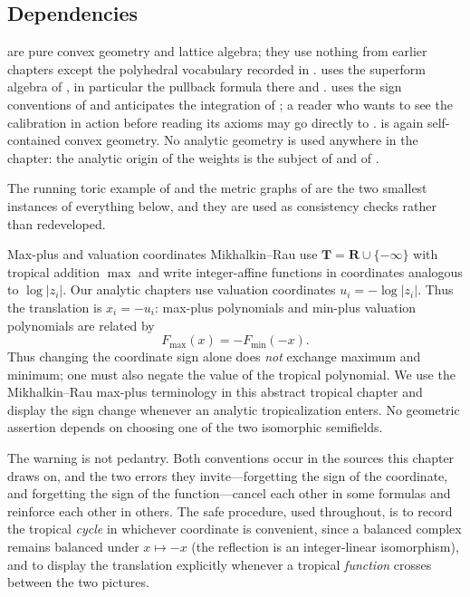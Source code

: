 \subsection*{Dependencies}

 are pure convex geometry and
lattice algebra; they use nothing from earlier chapters except the polyhedral
vocabulary recorded in .
 uses the superform algebra of
, in particular the pullback formula there and
.
 uses the sign conventions of
 and anticipates the integration of
; a reader who wants to see the calibration
in action before reading its axioms may go directly to
.
 is again self-contained convex geometry.
No analytic geometry is used anywhere in the chapter: the analytic origin of
the weights is the subject of  and of
.

The running toric example of  and the metric
graphs of  are the two smallest instances of
everything below, and they are used as consistency checks rather than
redeveloped.

\begin{warning}{Max-plus and valuation coordinates}
Mikhalkin--Rau use
$\mathbf T=\mathbf R\cup\{-\infty\}$ with tropical addition $\max$ and write
integer-affine functions in coordinates analogous to $\log|z_i|$.  Our
analytic chapters use valuation coordinates
$u_i=-\log|z_i|$.  Thus the translation is $x_i=-u_i$: max-plus polynomials
and min-plus valuation polynomials are related by
\[
                         F_{\max}(x)=-F_{\min}(-x).
\]
Thus changing the coordinate sign alone does \emph{not} exchange maximum
and minimum; one must also negate the value of the tropical polynomial.  We
use the Mikhalkin--Rau
max-plus terminology in this abstract tropical chapter and display the sign
change whenever an analytic tropicalization enters.  No geometric assertion
depends on choosing one of the two isomorphic semifields.
\end{warning}

The warning is not pedantry.  Both conventions occur in the sources this
chapter draws on, and the two errors they invite---forgetting the sign of the
coordinate, and forgetting the sign of the function---cancel each other in
some formulas and reinforce each other in others.  The safe procedure, used
throughout, is to record the tropical \emph{cycle} in whichever coordinate is
convenient, since a balanced complex remains balanced under $x\mapsto-x$
(the reflection is an integer-linear isomorphism), and to display the
translation explicitly whenever a tropical \emph{function} crosses between
the two pictures.

